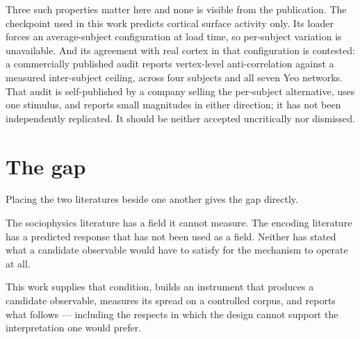 Three such properties matter here and none is visible from the publication. The checkpoint
used in this work predicts cortical surface activity only. Its loader forces an
average-subject configuration at load time, so per-subject variation is unavailable. And its
agreement with real cortex in that configuration is contested: a commercially published audit
reports vertex-level anti-correlation against a measured inter-subject ceiling, across four
subjects and all seven Yeo networks. That audit is self-published by a company selling the
per-subject alternative, uses one stimulus, and reports small magnitudes in either direction;
it has not been independently replicated. It should be neither accepted uncritically nor
dismissed.

\section{The gap}

Placing the two literatures beside one another gives the gap directly.

The sociophysics literature has a field it cannot measure. The encoding literature has a
predicted response that has not been used as a field. Neither has stated what a candidate
observable would have to satisfy for the mechanism to operate at all.

This work supplies that condition, builds an instrument that produces a candidate observable,
measures its spread on a controlled corpus, and reports what follows --- including the
respects in which the design cannot support the interpretation one would prefer.
